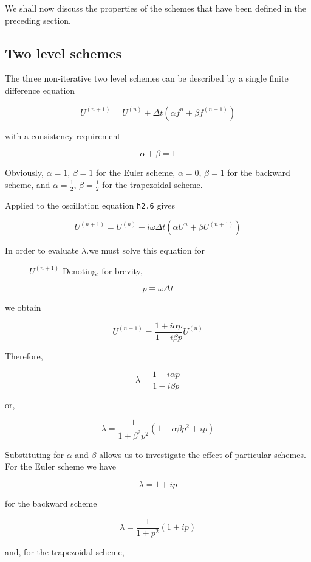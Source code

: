 We shall now discuss the properties of the schemes that have been
defined in the preceding section.

\subsection{Two level schemes}\label{two-level-schemes-1}

The three non-iterative two level schemes can be described by a single
finite difference equation

\[U^{( n + 1 )} = U^{\left( n \right)} + \Delta t\left( \alpha f^{n} + \beta f^{\left( n + 1 \right)} \right)\]

with a consistency requirement

\[\alpha + \beta = 1\]

Obviously, \(\alpha = 1\), \(\beta = 1\) for the Euler scheme,
\(\alpha = 0\), \(\beta = 1\) for the backward scheme, and
\(\alpha = \frac{1}{2}\), \(\beta = \frac{1}{2}\) for the trapezoidal
scheme.

Applied to the oscillation equation \texttt{h2.6} gives

\[U^{\left( n + 1 \right)} = U^{(n)} + i\omega\Delta t \left( \alpha U^n  + \beta U^{( n + 1 )}\right)\]

\begin{description}
    \item[In order to evaluate \(\lambda\).we must solve this equation for]
    \(U^{\left( n + 1 \right)}\) Denoting, for brevity,
\end{description}

\[p \equiv \omega\Delta t\]

we obtain

\[U^{\left( n + 1 \right)} = \frac{1 + i\alpha p}{1 - i\beta p}U^{\left( n \right)}\]

Therefore,

\[\lambda = \frac{1 + i\alpha p}{1 - i\beta p}\]

or,

\[\lambda = \frac{1}{1 + \beta^2 p^2}( 1 - \alpha\beta p^{2} + ip )\]

Substituting for \(\alpha\) and \(\beta\) allows us to investigate the
effect of particular schemes. For the Euler scheme we have

\[\lambda = 1 + ip\]

for the backward scheme

\[\lambda = \frac{1}{1 + p^{2}}\left( 1 + ip \right)\]

and, for the trapezoidal scheme,

